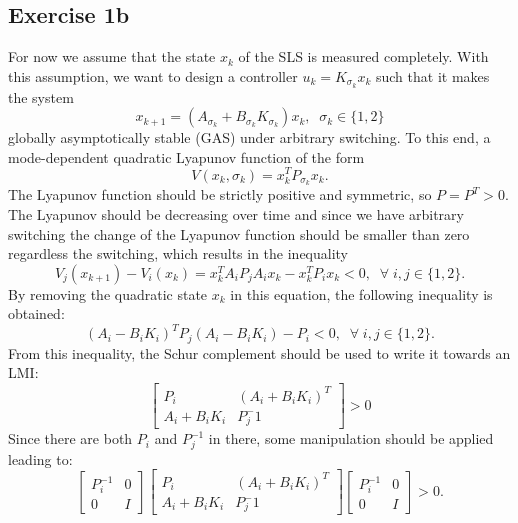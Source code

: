 \subsection{Exercise 1b}
For now we assume that the state $x_k$ of the SLS is measured completely. With this assumption, we want to design a controller $u_k = K_{\sigma_k} x_k$ such that it makes the system
\begin{equation}
    x_{k+1} = (A_{\sigma_k} + B_{\sigma_k} K_{\sigma_k}) x_k, \; \; \sigma_k \in \{1,2\}
    \label{eq:ex1b_system}
\end{equation}
globally asymptotically stable (GAS) under arbitrary switching. To this end, a mode-dependent quadratic Lyapunov function of the form 
\begin{equation}
    V(x_k, \sigma_k) = x_k^T P_{\sigma_k} x_k.
    \label{eq:ex1b_modelyap}
\end{equation}
The Lyapunov function should be strictly positive and symmetric, so $P = P^T > 0$. The Lyapunov should be decreasing over time and since we have arbitrary switching the change of the Lyapunov function should be smaller than zero regardless the switching, which results in the inequality
\begin{equation}
    V_j(x_{k+1}) - V_i(x_k) = x_k^T A_i P_j A_i x_k - x_k^T P_i x_k < 0, \; \; \forall \; i,j \in \{1,2\}.
    \label{eq:1b_lyapswitch}
\end{equation}
By removing the quadratic state $x_k$ in this equation, the following inequality is obtained:
\begin{equation}
    (A_i - B_i K_i)^T P_j (A_i - B_i K_i) - P_i < 0, \; \; \forall \; i,j \in \{1,2\}.
    \label{eq:1b_ineq1}
\end{equation}
From this inequality, the Schur complement should be used to write it towards an LMI:
\begin{equation}
    \begin{bmatrix} P_i & (A_i + B_i K_i)^T \\ A_i + B_i K_i & P_j^-1 \end{bmatrix} > 0
    \label{eq:ex1b_schur}
\end{equation}
Since there are both $P_i$ and $P_j^{-1}$ in there, some manipulation should be applied leading to: 
\begin{equation}
    \begin{bmatrix} P_i^{-1} & 0 \\ 0 & I \end{bmatrix} \begin{bmatrix} P_i & (A_i + B_i K_i)^T \\ A_i + B_i K_i & P_j^-1 \end{bmatrix}
    \begin{bmatrix} P_i^{-1} & 0 \\ 0 & I \end{bmatrix} > 0.
\end{equation}
